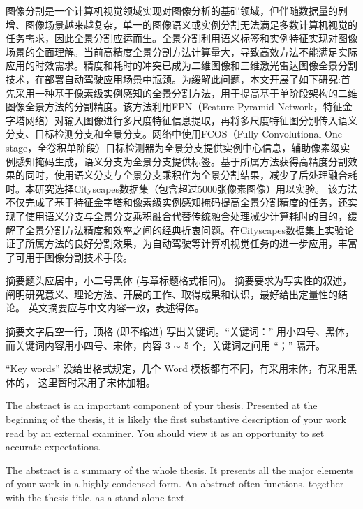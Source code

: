 \begin{cabstract}
    图像分割是一个计算机视觉领域实现对图像分析的基础领域，但伴随数据量的剧增、图像场景越来越复杂，单一的图像语义或实例分割无法满足多数计算机视觉的任务需求，因此全景分割应运而生。全景分割利用语义标签和实例特征实现对图像场景的全面理解。当前高精度全景分割方法计算量大，导致高效方法不能满足实际应用的时效需求。精度和耗时的冲突已成为二维图像和三维激光雷达图像全景分割技术，在部署自动驾驶应用场景中瓶颈。为缓解此问题，本文开展了如下研究:首先采用一种基于像素级实例感知的全景分割方法，用于提高基于单阶段架构的二维图像全景方法的分割精度。该方法利用FPN（Feature Pyramid Network，特征金字塔网络）对输入图像进行多尺度特征信息提取，再将多尺度特征图分别传入语义分支、目标检测分支和全景分支。网络中使用FCOS（Fully Convolutional One-stage，全卷积单阶段）目标检测器为全景分支提供实例中心信息，辅助像素级实例感知掩码生成，语义分支为全景分支提供标签。基于所属方法获得高精度分割效果的同时，使用语义分支与全景分支乘积作为全景分割结果，减少了后处理融合耗时。本研究选择Cityscapes数据集（包含超过5000张像素图像）用以实验。 
    该方法不仅完成了基于特征金字塔和像素级实例感知掩码提高全景分割精度的任务，还实现了使用语义分支与全景分支乘积融合代替传统融合处理减少计算耗时的目的，缓解了全景分割方法精度和效率之间的经典折衷问题。在Cityscapes数据集上实验论证了所属方法的良好分割效果，为自动驾驶等计算机视觉任务的进一步应用，丰富了可用于图像分割技术手段。

    摘要题头应居中，小二号黑体 (与章标题格式相同)。
    摘要要求为写实性的叙述，阐明研究意义、理论方法、开展的工作、取得成果和认识，最好给出定量性的结论。
    英文摘要应与中文内容一致，表述得体。

    摘要文字后空一行，顶格 (即不缩进) 写出关键词。``关键词：'' 用小四号、黑体，
    而关键词内容用小四号、宋体，内容 3 $\sim$ 5 个，关键词之间用  ``；'' 隔开。

    ``Key words'' 没给出格式规定，几个 Word 模板都有不同，有采用宋体，有采用黑体的，
    这里暂时采用了宋体加粗。


\end{cabstract}

\begin{eabstract}
    The abstract is an important component of your thesis. Presented at the
    beginning of the thesis, it is likely the first substantive description of
    your work read by an external examiner. You should view it as an opportunity
    to set accurate expectations.

    The abstract is a summary of the whole thesis. It presents all the major
    elements of your work in a highly condensed form.
    An abstract often functions, together with the thesis title,
    as a stand-alone text.

 
\end{eabstract}
